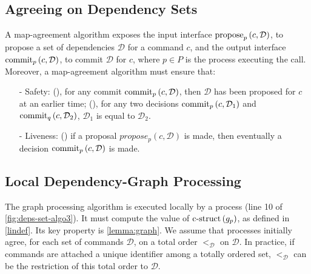 
\subsection{Agreeing on Dependency Sets}\label{map-algo}
A map-agreement algorithm exposes the input interface $\operatorname{propose}_p\left( c, \mathcal{D} \right)$, to propose a set of dependencies $\mathcal{D}$ for a command $c$, and the output interface $\operatorname{commit}_p\left( c, \mathcal{D} \right)$, to commit $\mathcal{D}$ for $c$, where $p\in P$ is the process executing the call.
Moreover, a map-agreement algorithm must ensure that: 

\begin{enumerate}
    \item[-] Safety: (), for any commit $\operatorname{commit}_p\left( c, \mathcal{D} \right)$, then $\mathcal{D}$ has been proposed for $c$ at an earlier time; (), for any two decisions $\operatorname{commit}_p\left( c, \mathcal{D}_1 \right)$ and $\operatorname{commit}_q\left( c, \mathcal{D}_2 \right)$, $\mathcal{D}_1$ is equal to $\mathcal{D}_2$.  
    \item[-] Liveness: () if a proposal $propose_p\left( c,\mathcal{D} \right)$ is made, then eventually a decision $\operatorname{commit}_p\left( c, \mathcal{D} \right)$ is made.
\end{enumerate}


\subsection{Local Dependency-Graph Processing}
\label{abstract-algo}

The graph processing algorithm is executed locally by a process (line 10 of \cref{fig:deps-set-algo3}). It must compute the value of $\operatorname{c-struct}\left( g_p \right)$, as defined in \cref{lindef}.
Its key property is \cref{lemma:graph}. 
We assume that processes initially agree, for each set of commands $\mathcal{D}$, on a total order $<_{\mathcal{D}}$ on $\mathcal{D}$.
In practice, if commands are attached a unique identifier among a totally ordered set, $<_{\mathcal{D}}$ can be the restriction of this total order to $\mathcal{D}$.

